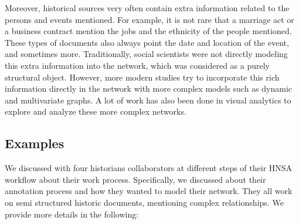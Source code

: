 \documentclass{vgtc}                          %
\begin{document}
Moreover, historical sources very often contain extra information related to the persons and events mentioned. For example, it is not rare that a marriage act or a business contract mention the jobs and the ethnicity of the people mentioned. These types of documents also always point the date and location of the event, and sometimes more.
Traditionally, social scientists were not directly modeling this extra information into the network, which was considered as a purely structural object. However, more modern studies try to incorporate this rich information directly in the network with more complex models such as dynamic and multivariate graphs. A lot of work has also been done in visual analytics to explore and analyze these more complex networks.

\subsection{Examples}\label{sec:examples}

We discussed with four historians collaborators at different steps of their HNSA workflow about their work process. Specifically, we discussed about their annotation process and how they wanted to model their network. They all work on semi structured historic documents, mentioning complex relationships. We provide more details in the following:
\end{document}
